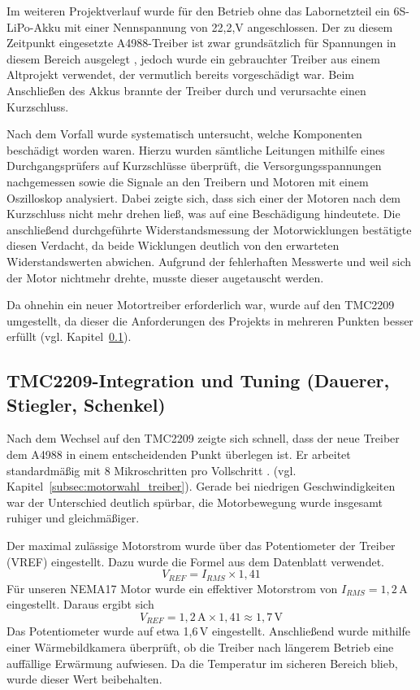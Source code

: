 \documentclass[fontsize=12pt,
parskip=half,	%
department=FakM,  %
logostyle=flat,
twoside, %
DIV=15,BCOR=10mm, %
]{OTHRreprt}
\begin{document}
Im weiteren Projektverlauf wurde für den Betrieb ohne das Labornetzteil ein 6S-LiPo-Akku mit einer Nennspannung von 22,2,V angeschlossen. Der zu diesem Zeitpunkt eingesetzte A4988-Treiber ist zwar grundsätzlich für Spannungen in diesem Bereich ausgelegt \cite{A4988}, jedoch wurde ein gebrauchter Treiber aus einem Altprojekt verwendet, der vermutlich bereits vorgeschädigt war. Beim Anschließen des Akkus brannte der Treiber durch und verursachte einen Kurzschluss.

Nach dem Vorfall wurde systematisch untersucht, welche Komponenten beschädigt worden waren. Hierzu wurden sämtliche Leitungen mithilfe eines Durchgangsprüfers auf Kurzschlüsse überprüft, die Versorgungsspannungen nachgemessen sowie die Signale an den Treibern und Motoren mit einem Oszilloskop analysiert. Dabei zeigte sich, dass sich einer der Motoren nach dem Kurzschluss nicht mehr drehen ließ, was auf eine Beschädigung hindeutete. Die anschließend durchgeführte Widerstandsmessung der Motorwicklungen bestätigte diesen Verdacht, da beide Wicklungen deutlich von den erwarteten Widerstandswerten abwichen. Aufgrund der fehlerhaften Messwerte und weil sich der Motor nichtmehr drehte, musste dieser augetauscht werden.

Da ohnehin ein neuer Motortreiber erforderlich war, wurde auf den TMC2209 umgestellt, da dieser die Anforderungen des Projekts in mehreren Punkten besser erfüllt (vgl. Kapitel~\ref{subsec:tmc2209_integration}).

\subsection{TMC2209-Integration und Tuning (Dauerer, Stiegler, Schenkel)}
\label{subsec:tmc2209_integration}

Nach dem Wechsel auf den TMC2209 zeigte sich schnell, dass der neue Treiber dem A4988 in einem entscheidenden Punkt überlegen ist. Er arbeitet standardmäßig mit 8 Mikroschritten pro Vollschritt \cite{Tmc2209_datasheet_rev109}. (vgl. Kapitel~\ref{subsec:motorwahl_treiber}). Gerade bei niedrigen Geschwindigkeiten war der Unterschied deutlich spürbar, die Motorbewegung wurde insgesamt ruhiger und gleichmäßiger.

Der maximal zulässige Motorstrom wurde über das Potentiometer der Treiber (VREF) eingestellt. Dazu wurde die Formel aus dem Datenblatt verwendet.
\begin{equation}
    V_{REF} = I_{RMS} \times 1{,}41
\end{equation}
Für unseren NEMA17 Motor wurde ein effektiver Motorstrom von $I_{RMS} = 1{,}2\,\text{A}$ eingestellt. Daraus ergibt sich
\begin{equation}
    V_{REF} = 1{,}2\,\text{A} \times 1{,}41 \approx 1{,}7\,\text{V}
\end{equation}
Das Potentiometer wurde auf etwa 1{,}6\,V eingestellt. Anschließend wurde mithilfe einer Wärmebildkamera überprüft, ob die Treiber nach längerem Betrieb eine auffällige Erwärmung aufwiesen. Da die Temperatur im sicheren Bereich blieb, wurde dieser Wert beibehalten.
\end{document}
